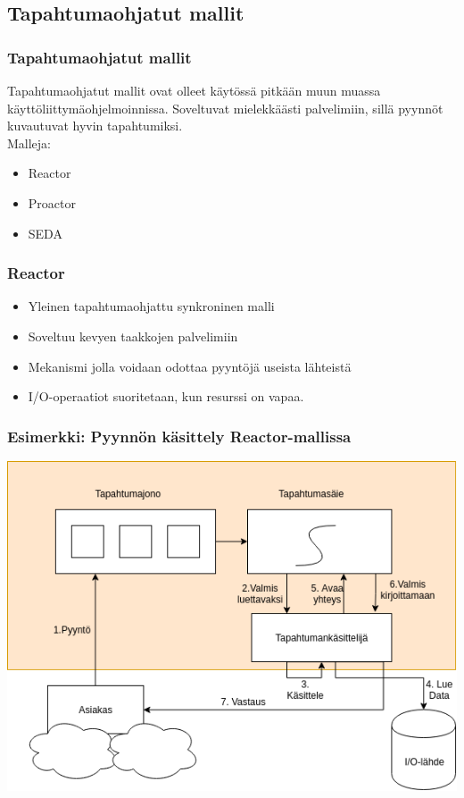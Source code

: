 \documentclass{beamer}
\begin{document}
\subsection{Tapahtumaohjatut mallit}
\begin{frame}
    \frametitle{Tapahtumaohjatut mallit}
    Tapahtumaohjatut mallit ovat olleet käytössä pitkään
    muun muassa käyttöliittymäohjelmoinnissa.
    Soveltuvat mielekkäästi palvelimiin, sillä
    pyynnöt kuvautuvat hyvin tapahtumiksi.\\
    Malleja:
    \begin{itemize}
        \item Reactor
        \item Proactor
        \item SEDA
    \end{itemize}
\end{frame}
\begin{frame}
    \frametitle{Reactor}
    \begin{itemize}
        \item Yleinen tapahtumaohjattu synkroninen malli
        \item Soveltuu kevyen taakkojen palvelimiin
        \item Mekanismi jolla voidaan odottaa pyyntöjä useista lähteistä
        \item I/O-operaatiot suoritetaan, kun resurssi on vapaa.
    \end{itemize}
\end{frame}
\begin{frame}
    \frametitle{Esimerkki: Pyynnön käsittely Reactor-mallissa}
        \includegraphics[scale=0.5]{reactor.png}
\end{frame}
\end{document}
